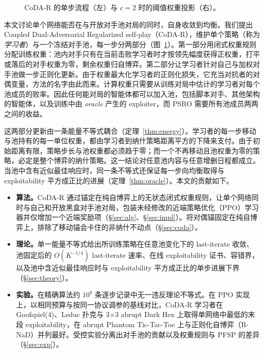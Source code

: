 \documentclass{article}
\theoremstyle{plain}
\theoremstyle{remark}
\newcommand{\codar}{CoDA-R}
\begin{document}
\begin{figure}[t]
\begin{center}

\end{center}
\vspace{-4pt}
\caption{\codar{} 的单步流程（左）与 $c=2$ 时的阈值权重投影（右）。}
\label{fig:overview}
\end{figure}

本文讨论单个网络能否在与开放对手池对局的同时，自身收敛到均衡。我们提出 Coupled Dual-Adversarial Regularized self-play（\codar{}），维护单个策略（称为\emph{学习者}）与一个冻结对手池，每一步分两部分（图~\ref{fig:overview}）。第一部分用闭式权重规则分配训练权重：池内对手只有在当前击败学习者时才按领先幅度获得正权重，打平或落后的对手权重为零，剩余权重归自博弈。第二部分让学习者针对自己与加权对手池做一步正则化更新。由于权重最大化学习者的正则化损失，它充当对抗者的对偶变量，方法的名字由此而来。计算权重只需要从训练对局中估计的学习者对每个池成员的败率。因此任何能对局的智能体都可以加入池，包括脚本对手、其他架构的智能体，以及训练中由 \emph{oracle} 产生的 exploiter，而 PSRO 需要所有池成员两两之间的收益。

这两部分更新由一条能量不等式耦合（定理~\ref{thm:energy}）。学习者的每一步移动与池持有的每一单位权重，都由学习者到纳什策略距离平方的下降来支付。由于初始距离有限，策略步长与池权重都必须趋于零；而一个不再移动且池权重为零的策略，必定是整个博弈的纳什策略。这一结论对任意池内容与任意增删日程都成立。当池中含有近似最佳响应时，同一条不等式还保证每一步向均衡取得与 exploitability 平方成正比的进展（定理~\ref{thm:oracle}）。本文的贡献如下。
\begin{itemize}
\item \textbf{算法。}\codar{} 通过锚定在纯自博弈上的无状态闭式权重规则，让单个网络同时与自己和开放黑盒对手池对局，包装未经修改的近端策略优化（PPO）\citep{schulman2017ppo}学习器并仅增加一个近端奖励项（\S\ref{sec:alg}、\S\ref{sec:impl}）。将对偶锚固定在纯自博弈上，排除了移动锚会卡住的非纳什不动点（\S\ref{sec:coda}）。
\item \textbf{理论。}单一能量不等式给出所训练策略在任意池变化下的 last-iterate 收敛、池固定后的 $O(K^{-1/4})$ last-iterate 速率、在线 exploitability 证书、容错界，以及池中含近似最佳响应时与 exploitability 平方成正比的单步进展下界（\S\ref{sec:theory}）。
\item \textbf{实验。}在精确算法约 $10^8$ 条逐步记录中无一违反理论不等式。在 PPO 实现上，以相同预算与按同一协议调参的基线对比，\codar{} 学习者在 Goofspiel(4)、Leduc 扑克与 3$\times$3 abrupt Dark Hex 上取得单网络中最低的末段 exploitability，在 abrupt Phantom Tic-Tac-Toe 上与正则化自博弈（R-NaD）并列最好。受控实验分离出对手池的贡献以及权重规则与 PFSP 的差异（\S\ref{sec:exp}）。
\end{itemize}
\end{document}
